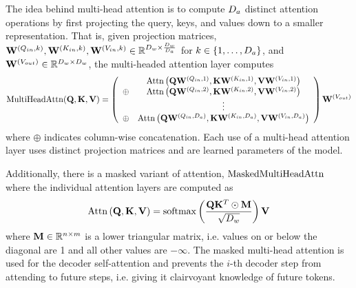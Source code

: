   The idea behind multi-head attention is to compute ${D_a}$ distinct
  attention operations by first projecting the query, keys, and values
  down to a smaller representation. That is, given projection
  matrices, $\mathbf{W}^{(Q_{in},k)}, \mathbf{W}^{(K_{in},k)}, \mathbf{W}^{(V_{in},k)} \in \mathbb{R}^{D_{w} \times \frac{D_{w}}{{D_a}}}$ for $k \in \{1,\ldots,{D_a}\}$, and $\mathbf{W}^{(V_{out})} \in \mathbb{R}^{D_{w} \times D_{w}}$,
the  multi-headed attention layer computes
\[ \operatorname{MultiHeadAttn}(\mathbf{Q}, \mathbf{K}, \mathbf{V}) = \left(\begin{array}{lc}
            &\operatorname{Attn}\left(\mathbf{Q}\mathbf{W}^{(Q_{in},1)},  
                 \mathbf{K}\mathbf{W}^{(K_{in},1)}, \mathbf{V}\mathbf{W}^{(V_{in},1)}\right)\\
              \oplus &   
                  \operatorname{Attn}\left(\mathbf{Q}\mathbf{W}^{(Q_{in},2)}, 
              \mathbf{K}\mathbf{W}^{(K_{in},2)}, \mathbf{V}\mathbf{W}^{(V_{in},2)}\right)\\
              & \vdots \\
              \oplus & 
            \operatorname{Attn}\left(\mathbf{Q}\mathbf{W}^{(Q_{in},{D_a})},  
                 \mathbf{K}\mathbf{W}^{(K_{in},{D_a})}, \mathbf{V}\mathbf{W}^{(V_{in},{D_a})}\right)\\
        \end{array}\right) \mathbf{W}^{(V_{out})}
 \]
  where $\oplus$ indicates column-wise concatenation. Each use of a
  multi-head attention layer uses distinct projection matrices
  and are learned parameters of the model.

%
%


Additionally, there is a masked variant of attention, $\operatorname{MaskedMultiHeadAttn}$
  where the individual attention layers are computed as
  \[\operatorname{Attn}\left(\mathbf{Q}, \mathbf{K}, \mathbf{V}\right) = \operatorname*{softmax}\left(\frac{\mathbf{Q} \mathbf{K}^T \odot \mathbf{M} }{\sqrt{D_{w}}} \right)\mathbf{V} \]
where $\mathbf{M} \in \mathbb{R}^{n \times m}$ 
 is a lower triangular matrix, i.e. values on or below the diagonal are 1
  and all other values are $-\infty$.  The masked multi-head attention
  is used for the decoder self-attention and prevents the $i$-th decoder
  step from attending to future steps, i.e. giving it clairvoyant knowledge 
  of future tokens.

